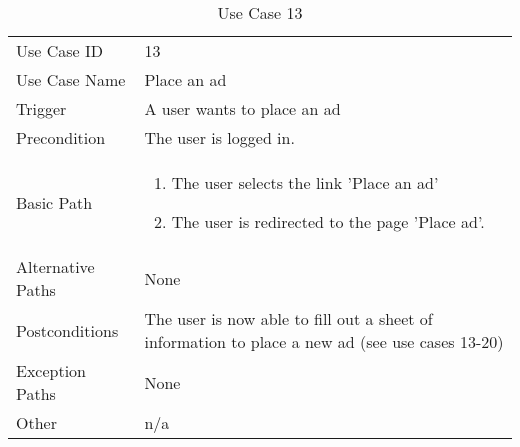 \begin{table}[H]
\centering
\label{table-use-case-13}
\begin{tabular}{|p{3cm}|p{10cm}}
Use Case ID       & 13                                                      \\
Use Case Name     & Place an ad                            \\
Trigger           & A user wants to place an ad\\
Precondition      & The user is logged in.             \\
Basic Path        & \begin{enumerate}
\item The user selects the link 'Place an ad'
\item The user is redirected to the page 'Place ad'. 
\end{enumerate} 
     \\
Alternative Paths & None                          \\
Postconditions    & The user is now able to fill out a sheet of information to
place a new ad (see use cases 13-20)	\\
Exception Paths   & None			\\
Other             & n/a                                                                                                                                                                                                        
\end{tabular}
\caption{Use Case 13}
\end{table}

